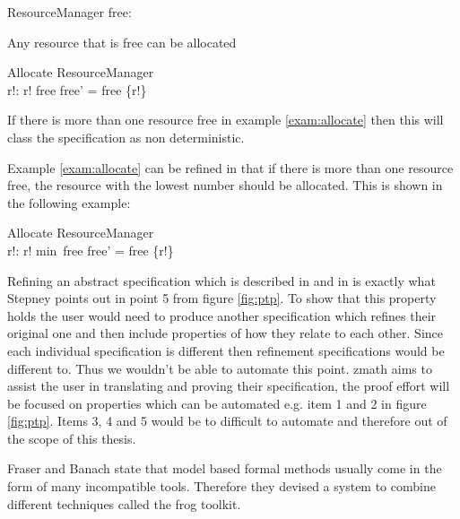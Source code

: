 \begin{exam}

\begin{schema}{ResourceManager}
free:  \nat
\end{schema}

 Any resource that is free can be allocated

\begin{schema}{Allocate}
\Delta ResourceManager \\
r!: \nat
\where
r! \in free \land free' = free \setminus \{r!\}
\end{schema}

\label{exam:allocate} 
\end{exam}

If there is more than one resource free in example \ref{exam:allocate} then this
will class the specification as non deterministic.

Example \ref{exam:allocate} can be refined in that if there is more than one
resource free, the resource with the lowest number should be allocated. This is
shown in the following example:

\begin{exam}

\begin{schema}{Allocate}
\Delta ResourceManager \\
r!: \nat
\where
r! \in min~free \land free' = free \setminus \{r!\}
\end{schema}
\label{exam:allocaterefine} 
\end{exam}

Refining an abstract specification which is described in
\cite{Woodcock:1996:UZS:235337} and in \cite{spiveyreferencemanual} is exactly
what Stepney points out in point 5 from figure \ref{fig:ptp}. To show that this
property holds the user would need to produce another specification which
refines their original one and then include properties of how they relate to
each other. Since each individual specification is different then refinement
specifications would be different to. Thus we wouldn't be able to automate this
point. \gls{zmath} aims to assist the user in translating and proving their
specification, the proof effort will be focused on properties which can be
automated e.g. item 1 and 2 in figure \ref{fig:ptp}. Items 3, 4 and 5 would be to
difficult to automate and therefore out of the scope of this thesis.

Fraser and Banach \cite{DBLP:conf/sefm/FraserB07} state that model based formal
methods usually come in the form of many incompatible tools. Therefore they
devised a system to combine different techniques called the frog toolkit.

